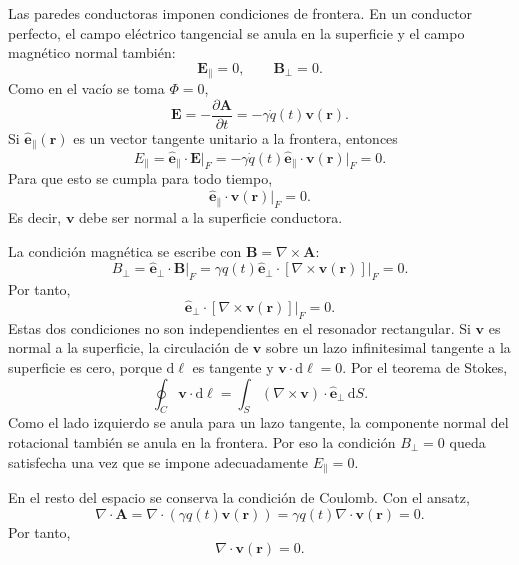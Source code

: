 \documentclass[11pt]{article}
\newcommand{\dd}{\mathrm{d}}
\newcommand{\vb}[1]{\mathbf{#1}}
\newcommand{\uv}[1]{\hat{\vb e}_{#1}}
\begin{document}
Las paredes conductoras imponen condiciones de frontera. En un conductor
perfecto, el campo el\'ectrico tangencial se anula en la superficie y el campo
magn\'etico normal tambi\'en:
\begin{equation}
  \vb E_{\parallel}=0,
  \qquad
  \vb B_{\perp}=0.
\end{equation}
Como en el vac\'io se toma $\Phi=0$,
\begin{equation}
  \vb E=-\frac{\partial\vb A}{\partial t}
  =
  -\gamma\dot q(t)\vb v(\vb r).
\end{equation}
Si $\uv{\parallel}(\vb r)$ es un vector tangente unitario a la frontera,
entonces
\begin{equation}
  E_\parallel
  =
  \uv{\parallel}\cdot\vb E\big|_F
  =
  -\gamma\dot q(t)
  \uv{\parallel}\cdot\vb v(\vb r)\big|_F
  =
  0.
\end{equation}
Para que esto se cumpla para todo tiempo,
\begin{equation}
  \boxed{
  \uv{\parallel}\cdot\vb v(\vb r)\big|_F=0.
  }
\end{equation}
Es decir, $\vb v$ debe ser normal a la superficie conductora.

La condici\'on magn\'etica se escribe con $\vb B=\nabla\times\vb A$:
\begin{equation}
  B_\perp
  =
  \uv{\perp}\cdot\vb B\big|_F
  =
  \gamma q(t)
  \uv{\perp}\cdot
  [\nabla\times\vb v(\vb r)]\big|_F
  =
  0.
\end{equation}
Por tanto,
\begin{equation}
  \boxed{
  \uv{\perp}\cdot
  [\nabla\times\vb v(\vb r)]\big|_F=0.
  }
\end{equation}
Estas dos condiciones no son independientes en el resonador rectangular.
Si $\vb v$ es normal a la superficie, la circulaci\'on de $\vb v$ sobre un lazo
infinitesimal tangente a la superficie es cero, porque $\dd\vb \ell$ es
tangente y $\vb v\cdot\dd\vb \ell=0$. Por el teorema de Stokes,
\begin{equation}
  \oint_C\vb v\cdot\dd\vb \ell
  =
  \int_S(\nabla\times\vb v)\cdot\uv{\perp}\,\dd S.
\end{equation}
Como el lado izquierdo se anula para un lazo tangente, la componente normal
del rotacional tambi\'en se anula en la frontera. Por eso la condici\'on
$B_\perp=0$ queda satisfecha una vez que se impone adecuadamente
$E_\parallel=0$.

En el resto del espacio se conserva la condici\'on de Coulomb. Con el ansatz,
\begin{equation}
  \nabla\cdot\vb A
  =
  \nabla\cdot(\gamma q(t)\vb v(\vb r))
  =
  \gamma q(t)\nabla\cdot\vb v(\vb r)
  =
  0.
\end{equation}
Por tanto,
\begin{equation}
  \boxed{\nabla\cdot\vb v(\vb r)=0.}
\end{equation}
\end{document}
